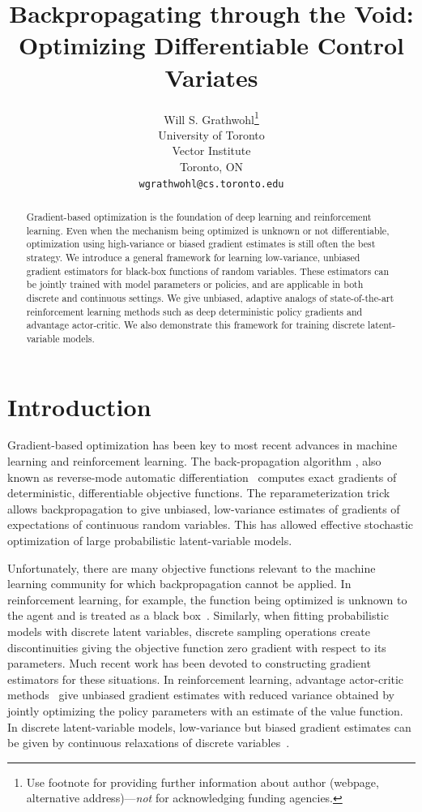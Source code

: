 \documentclass{article}
\title{Backpropagating through the Void:\\ Optimizing Differentiable Control Variates}
\author{
  Will S. Grathwohl\thanks{Use footnote for providing further
    information about author (webpage, alternative
    address)---\emph{not} for acknowledging funding agencies.} \\
  University of Toronto\\
  Vector Institute\\
  Toronto, ON \\
  \texttt{wgrathwohl@cs.toronto.edu} \\
}
\begin{document}
\maketitle
\begin{abstract}
Gradient-based optimization is the foundation of deep learning and reinforcement learning.
Even when the mechanism being optimized is unknown or not differentiable, optimization using high-variance or biased gradient estimates is still often the best strategy.
We introduce a general framework for learning low-variance, unbiased gradient estimators for black-box functions of random variables.
These estimators can be jointly trained with model parameters or policies, and are applicable in both discrete and continuous settings.
We give unbiased, adaptive analogs of state-of-the-art reinforcement learning methods such as deep deterministic policy gradients and advantage actor-critic.
We also demonstrate this framework for training discrete latent-variable models.
\end{abstract}


\section{Introduction}
Gradient-based optimization has been key to most recent advances in machine learning and reinforcement learning.
The back-propagation algorithm \citep{rumelhart1986learning}, also known as reverse-mode automatic differentiation~\citep{speelpenning1980compiling, rall1981automatic} computes exact gradients of deterministic, differentiable objective functions.
The reparameterization trick \citep{williams1992simple, kingma2013autoencoding, rezende2014stochastic} allows backpropagation to give unbiased, low-variance estimates of gradients of expectations of continuous random variables.
This has allowed effective stochastic optimization of large probabilistic latent-variable models.

Unfortunately, there are many objective functions relevant to the machine learning community for which backpropagation cannot be applied. In reinforcement learning, for example, the function being optimized is unknown to the agent and is treated as a black box~\citep{schulman2015gradient}. Similarly, when fitting probabilistic models with discrete latent variables, discrete sampling operations create discontinuities giving the objective function zero gradient with respect to its parameters.
Much recent work has been devoted to constructing gradient estimators for these situations.
In reinforcement learning, advantage actor-critic methods~\citep{mnih2016asynchronous} give unbiased gradient estimates with reduced variance obtained by jointly optimizing the policy parameters with an estimate of the value function.
In discrete latent-variable models, low-variance but biased gradient estimates can be given by continuous relaxations of discrete variables~\citep{maddison2016concrete, jang2016categorical}.
\end{document}
